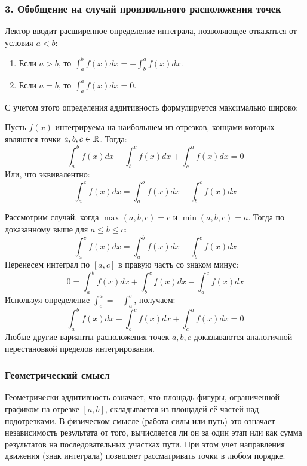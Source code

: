\subsubsection*{3. Обобщение на случай произвольного расположения точек}

Лектор вводит расширенное определение интеграла, позволяющее отказаться от условия $a < b$:
\begin{enumerate}
    \item Если $a > b$, то $\int_a^b f(x) dx = -\int_b^a f(x) dx$.
    \item Если $a = b$, то $\int_a^a f(x) dx = 0$.
\end{enumerate}

С учетом этого определения аддитивность формулируется максимально широко:

\begin{theorem}
Пусть $f(x)$ интегрируема на наибольшем из отрезков, концами которых являются точки $a, b, c \in \mathbb{R}$. Тогда:
\[ \int_a^b f(x) dx + \int_b^c f(x) dx + \int_c^a f(x) dx = 0 \]
Или, что эквивалентно:
\[ \int_a^c f(x) dx = \int_a^b f(x) dx + \int_b^c f(x) dx \]
\end{theorem}

\begin{tcolorbox}[title=Доказательство, breakable]
Рассмотрим случай, когда $\max(a, b, c) = c$ и $\min(a, b, c) = a$. Тогда по доказанному выше для $a \le b \le c$:
\[ \int_a^c f(x) dx = \int_a^b f(x) dx + \int_b^c f(x) dx \]
Перенесем интеграл по $[a, c]$ в правую часть со знаком минус:
\[ 0 = \int_a^b f(x) dx + \int_b^c f(x) dx - \int_a^c f(x) dx \]
Используя определение $\int_c^a = -\int_a^c$, получаем:
\[ \int_a^b f(x) dx + \int_b^c f(x) dx + \int_c^a f(x) dx = 0 \]
Любые другие варианты расположения точек $a, b, c$ доказываются аналогичной перестановкой пределов интегрирования.
\end{tcolorbox}

\subsubsection*{Геометрический смысл}
Геометрически аддитивность означает, что площадь фигуры, ограниченной графиком на отрезке $[a, b]$, складывается из площадей её частей над подотрезками. В физическом смысле (работа силы или путь) это означает независимость результата от того, вычисляется ли он за один этап или как сумма результатов на последовательных участках пути. При этом учет направления движения (знак интеграла) позволяет рассматривать точки в любом порядке.

